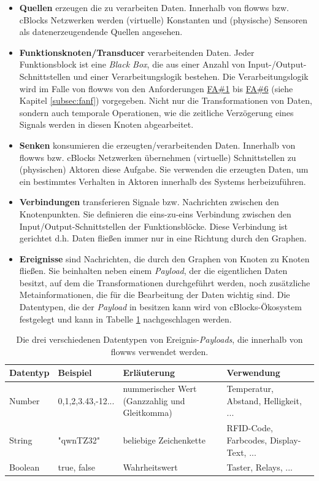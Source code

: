 \begin{itemize}
    \item \textbf{Quellen} erzeugen die zu verarbeiten Daten. Innerhalb von flowws bzw. cBlocks Netzwerken werden (virtuelle) Konstanten und (physische) Sensoren als datenerzeugendende Quellen angesehen. 
    \item \textbf{Funktionsknoten/Transducer} verarbeitenden Daten. Jeder Funktionsblock ist eine \textit{Black Box}, die aus einer Anzahl von Input-/Output-Schnittstellen und einer Verarbeitungslogik bestehen. Die Verarbeitungslogik wird im Falle von flowws von den Anforderungen \hyperref[tab:fanf]{FA\#1} bis \hyperref[tab:fanf]{FA\#6} (siehe Kapitel \ref{subsec:fanf}) vorgegeben. Nicht nur die Transformationen von Daten, sondern auch temporale Operationen, wie die zeitliche Verzögerung eines Signals werden in diesen Knoten abgearbeitet. 
    \item \textbf{Senken} konsumieren die erzeugten/verarbeitenden Daten. Innerhalb von flowws bzw. cBlocks Netzwerken übernehmen (virtuelle) Schnittstellen zu (physischen) Aktoren diese Aufgabe. Sie verwenden die erzeugten Daten, um ein bestimmtes Verhalten in Aktoren innerhalb des Systems herbeizuführen.
    \item \textbf{Verbindungen} transferieren Signale bzw. Nachrichten zwischen den Knotenpunkten. Sie definieren die eins-zu-eins Verbindung zwischen den Input/Output-Schnittstellen der Funktionsblöcke. Diese Verbindung ist gerichtet d.h. Daten fließen immer nur in eine Richtung durch den Graphen.
    \item \textbf{Ereignisse} sind Nachrichten, die durch den Graphen von Knoten zu Knoten fließen. Sie beinhalten neben einem \textit{Payload}, der die eigentlichen Daten besitzt, auf dem die Transformationen durchgeführt werden, noch zusätzliche Metainformationen, die für die Bearbeitung der Daten wichtig sind. Die Datentypen, die der \textit{Payload} in besitzen kann wird von cBlocks-Ökosystem festgelegt und kann in Tabelle \ref{tab:datentypenpayloads} nachgeschlagen werden.
\end{itemize}

\begin{table}[h]
\begin{tabularx}{\textwidth}{llXX}
\hline
\rowcolor[HTML]{EFEFEF} 
Datentyp & Beispiel &  Erläuterung &  Verwendung \\ \hline
Number & 0,1,2,3.43,-12...& nummerischer Wert (Ganzzahlig und Gleitkomma) & Temperatur, Abstand, Helligkeit, ...   \\ \hline
String & "qwnTZ32" & beliebige Zeichenkette & RFID-Code, Farbcodes, Display-Text, ... \\ \hline
Boolean & true, false & Wahrheitswert & Taster, Relays, ... \\ \hline
\end{tabularx}
\caption{Die drei verschiedenen Datentypen von Ereignis-\textit{Payloads}, die innerhalb von flowws verwendet werden.}
\label{tab:datentypenpayloads}
\end{table}

